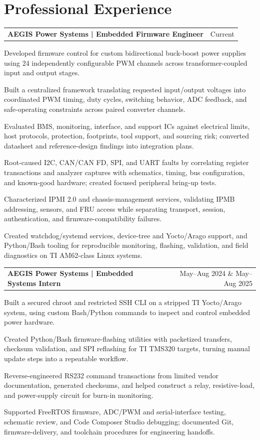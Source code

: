 \documentclass[10pt,letterpaper]{article}
\makeatletter
\newcommand{\resumeentry}[3]{%
  \begin{tabularx}{\textwidth}{@{}Xr@{}}
    \textbf{#1} & #2
  \end{tabularx}\vspace{-0.08cm}
  #3
}
\makeatother
\begin{document}
\section{Professional Experience}
\resumeentry{AEGIS Power Systems | Embedded Firmware Engineer}{Current}{
\begin{resumebullets}
  \item Developed firmware control for custom bidirectional buck-boost power supplies using 24 independently configurable PWM channels across transformer-coupled input and output stages.
  \item Built a centralized framework translating requested input/output voltages into coordinated PWM timing, duty cycles, switching behavior, ADC feedback, and safe-operating constraints across paired converter channels.
  \item Evaluated BMS, monitoring, interface, and support ICs against electrical limits, host protocols, protection, footprints, tool support, and sourcing risk; converted datasheet and reference-design findings into integration plans.
  \item Root-caused I2C, CAN/CAN FD, SPI, and UART faults by correlating register transactions and analyzer captures with schematics, timing, bus configuration, and known-good hardware; created focused peripheral bring-up tests.
  \item Characterized IPMI 2.0 and chassis-management services, validating IPMB addressing, sensors, and FRU access while separating transport, session, authentication, and firmware-compatibility failures.
  \item Created watchdog/systemd services, device-tree and Yocto/Arago support, and Python/Bash tooling for reproducible monitoring, flashing, validation, and field diagnostics on TI AM62-class Linux systems.
\end{resumebullets}}

\resumeentry{AEGIS Power Systems | Embedded Systems Intern}{May--Aug 2024 \& May--Aug 2025}{
\begin{resumebullets}
  \item Built a secured chroot and restricted SSH CLI on a stripped TI Yocto/Arago system, using custom Bash/Python commands to inspect and control embedded power hardware.
  \item Created Python/Bash firmware-flashing utilities with packetized transfers, checksum validation, and SPI reflashing for TI TMS320 targets, turning manual update steps into a repeatable workflow.
  \item Reverse-engineered RS232 command transactions from limited vendor documentation, generated checksums, and helped construct a relay, resistive-load, and power-supply circuit for burn-in monitoring.
  \item Supported FreeRTOS firmware, ADC/PWM and serial-interface testing, schematic review, and Code Composer Studio debugging; documented Git, firmware-delivery, and toolchain procedures for engineering handoffs.
\end{resumebullets}}
\end{document}
